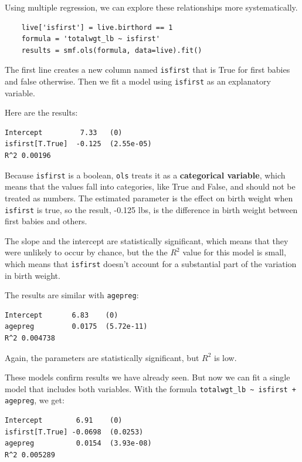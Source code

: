 \documentclass[12pt]{book}
\theoremstyle{exercise}
\begin{document}
Using multiple regression, we can explore these relationships
more systematically.%

\begin{verbatim}
    live['isfirst'] = live.birthord == 1
    formula = 'totalwgt_lb ~ isfirst'
    results = smf.ols(formula, data=live).fit()
\end{verbatim}

The first line creates a new column named {\tt isfirst} that is
True for first babies and false otherwise.  Then we fit a model
using {\tt isfirst} as an explanatory variable.%
%

Here are the results:

\begin{verbatim}
Intercept         7.33   (0)
isfirst[T.True]  -0.125  (2.55e-05)
R^2 0.00196
\end{verbatim}

Because {\tt isfirst} is a boolean, {\tt ols} treats it as a
{\bf categorical variable}, which means that the values fall
into categories, like True and False, and should not be treated
as numbers.  The estimated parameter is the effect on birth
weight when {\tt isfirst} is true, so the result,
-0.125 lbs, is the difference in
birth weight between first babies and others.%
%
%
%

The slope and the intercept are statistically significant,
which means that they were unlikely to occur by chance, but the
the $R^2$ value for this model is small, which means that
{\tt isfirst} doesn't account for a substantial part of the
variation in birth weight.%
%

The results are similar with {\tt agepreg}:

\begin{verbatim}
Intercept       6.83    (0)
agepreg         0.0175  (5.72e-11)
R^2 0.004738
\end{verbatim}

Again, the parameters are statistically significant, but
$R^2$ is low.%
%

These models confirm results we have already seen.  But now we
can fit a single model that includes both variables.  With the
formula \verb"totalwgt_lb ~ isfirst + agepreg", we get:

\begin{verbatim}
Intercept        6.91    (0)
isfirst[T.True] -0.0698  (0.0253)
agepreg          0.0154  (3.93e-08)
R^2 0.005289
\end{verbatim}
\end{document}
